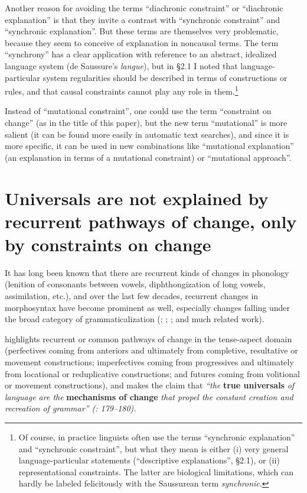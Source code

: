 \documentclass[output=paper]{langsci/langscibook}
\begin{document}
Another reason for avoiding the terms “diachronic constraint” or “diachronic explanation” is that they invite a contrast with “synchronic constraint” and “synchronic explanation”. But these terms are themselves very problematic, because they seem to conceive of explanation in noncausal terms. The term “synchrony” has a clear application with reference to an abstract, idealized language system (de Saussure’s \textit{langue}), but in §2.1 I noted that language-particular system regularities should be described in terms of constructions or rules, and that causal constraints cannot play any role in them.\footnote{Of course, in practice linguists often use the terms “synchronic explanation” and “synchronic constraint”, but what they mean is either (i) very general language-particular statements (“descriptive explanations”, §2.1), or (ii) representational constraints. The latter are biological limitations, which can hardly be labeled felicitously with the Saussurean term \textit{synchronic}.} 

Instead of “mutational constraint”, one could use the term “constraint on change” (as in the title of this paper), but the new term “mutational” is more salient (it can be found more easily in automatic text searches), and since it is more specific, it can be used in new combinations like “mutational explanation” (an explanation in terms of a mutational constraint) or “mutational approach”.

\section{Universals are not explained by recurrent pathways of change, only by constraints on change}

It has long been known that there are recurrent kinds of changes in phonology (lenition of consonants between vowels, diphthongization of long vowels, assimilation, etc.), and over the last few decades, recurrent changes in morphosyntax have become prominent as well, especially changes falling under the broad category of grammaticalization (\citealt{Lehmann1982}; \citealt{HeineEtAl1991}; \citealt{BybeeEtAl1994}; and much related work).

\citet{Bybee2006} highlights recurrent or common pathways of change in the tense-aspect domain (perfectives coming from anteriors and ultimately from completive, resultative or movement constructions; imperfectives coming from progressives and ultimately from locational or reduplicative constructions; and futures coming from volitional or movement constructions), and makes the claim that \emph{“\textup{the} }\textbf{{true universals}}\emph{ \textup{of} \emph{language are the} }\textbf{{mechanisms of change}}\emph{ \emph{that propel the constant creation and recreation of grammar” (\citealt{Bybee2006}: 179–180).}}
\end{document}
